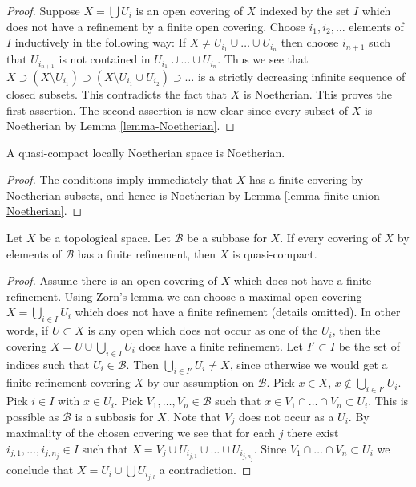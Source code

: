 \begin{proof}
Suppose $X = \bigcup U_i$ is an open covering of $X$ indexed
by the set $I$ which does not have a refinement by a finite
open covering. Choose $i_1, i_2, \ldots $ elements of $I$ inductively
in the following way: If $X \not = U_{i_1} \cup \ldots \cup U_{i_n}$
then choose $i_{n + 1}$ such that $U_{i_{n + 1}}$ is not contained
in $U_{i_1} \cup \ldots \cup U_{i_n}$. Thus we see that
$X \supset (X \setminus U_{i_1}) \supset
(X \setminus U_{i_1} \cup U_{i_2}) \supset \ldots$ is a strictly
decreasing infinite sequence of closed subsets. This contradicts
the fact that $X$ is Noetherian. This proves the first assertion.
The second assertion is now clear since every subset of $X$ is Noetherian by
Lemma \ref{lemma-Noetherian}.
\end{proof}

\begin{lemma}
\label{lemma-quasi-compact-locally-Noetherian-Noetherian}
A quasi-compact locally Noetherian space is Noetherian.
\end{lemma}

\begin{proof}
The conditions imply immediately that $X$ has a finite covering by
Noetherian subsets, and hence is Noetherian by
Lemma \ref{lemma-finite-union-Noetherian}.
\end{proof}

\begin{lemma}
\label{lemma-subbase-theorem}
Let $X$ be a topological space. Let $\mathcal{B}$ be a subbase for $X$.
If every covering of $X$ by elements of $\mathcal{B}$ has a finite
refinement, then $X$ is quasi-compact.
\end{lemma}

\begin{proof}
Assume there is an open covering of $X$ which does not have a finite
refinement. Using Zorn's lemma we can choose a maximal open covering
$X = \bigcup_{i \in I} U_i$ which does not have a finite refinement
(details omitted).
In other words, if $U \subset X$ is any open which does not occur as
one of the $U_i$, then the covering $X = U \cup \bigcup_{i \in I} U_i$
does have a finite refinement. Let $I' \subset I$ be the set of indices
such that $U_i \in \mathcal{B}$. Then $\bigcup_{i \in I'} U_i \not = X$,
since otherwise we would get a finite refinement covering $X$ by our
assumption on $\mathcal{B}$. Pick $x \in X$,
$x \not \in \bigcup_{i \in I'} U_i$. Pick $i \in I$ with $x \in U_i$.
Pick $V_1, \ldots, V_n \in \mathcal{B}$ such that
$x \in V_1 \cap \ldots \cap V_n \subset U_i$. This is
possible as $\mathcal{B}$ is a subbasis for $X$. Note that
$V_j$ does not occur as a $U_i$. By maximality of the chosen
covering we see that for each $j$ there exist
$i_{j, 1}, \ldots, i_{j, n_j} \in I$ such that
$X = V_j \cup U_{i_{j, 1}} \cup \ldots \cup U_{i_{j, n_j}}$.
Since $V_1 \cap \ldots \cap V_n \subset U_i$ we conclude that
$X = U_i \cup \bigcup U_{i_{j, l}}$ a contradiction.
\end{proof}






